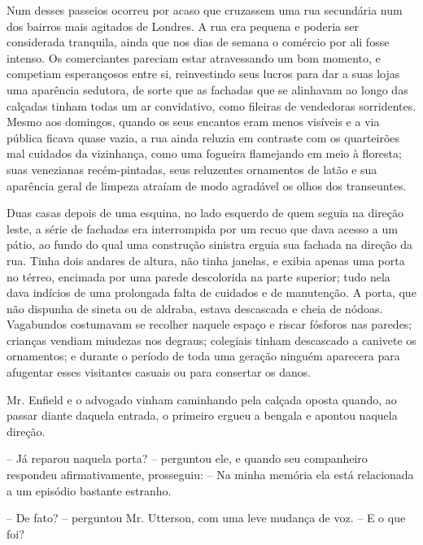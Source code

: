 Num desses passeios ocorreu por acaso que cruzassem uma rua secundária
num dos bairros mais agitados de Londres.  A rua era pequena e poderia
ser considerada tranquila, ainda que nos dias de semana o comércio por
ali fosse intenso.  Os comerciantes pareciam estar atravessando um bom
momento, e competiam esperançosos entre si, reinvestindo seus lucros
para dar a suas lojas uma aparência sedutora, de sorte que as fachadas
que se alinhavam ao longo das calçadas tinham todas um ar convidativo,
como fileiras de vendedoras sorridentes.  Mesmo aos domingos, quando os
seus encantos eram menos visíveis e a via pública ficava quase vazia, a
rua ainda reluzia em contraste com os quarteirões mal cuidados da
vizinhança, como uma fogueira flamejando em meio à floresta; suas
venezianas recém-pintadas, seus reluzentes ornamentos de latão e sua
aparência geral de limpeza atraíam de modo agradável os olhos dos
transeuntes.

Duas casas depois de uma esquina, no lado esquerdo de quem seguia na
direção leste, a série de fachadas era interrompida por um recuo que
dava acesso a um pátio, ao fundo do qual uma construção sinistra erguia
sua fachada na direção da rua.  Tinha dois andares de altura, não tinha
janelas, e exibia apenas uma porta no térreo, encimada por uma parede
descolorida na parte superior; tudo nela dava indícios de uma
prolongada falta de cuidados e de manutenção.  A porta, que não
dispunha de sineta ou de aldraba, estava descascada e cheia de nódoas. 
Vagabundos costumavam se recolher naquele espaço e riscar fósforos nas
paredes; crianças vendiam miudezas nos degraus; colegiais tinham
descascado a canivete os ornamentos; e durante o período de toda uma
geração ninguém aparecera para afugentar esses visitantes casuais ou
para consertar os danos.

Mr. Enfield e o advogado vinham caminhando pela calçada oposta quando,
ao passar diante daquela entrada, o primeiro ergueu a bengala e apontou
naquela direção.

-- Já reparou naquela porta? -- perguntou ele, e quando seu companheiro
respondeu afirmativamente, prosseguiu: -- Na minha memória ela está
relacionada a um episódio bastante estranho.

-- De fato? -- perguntou Mr. Utterson, com uma leve mudança de voz. -- E
o que foi? 

